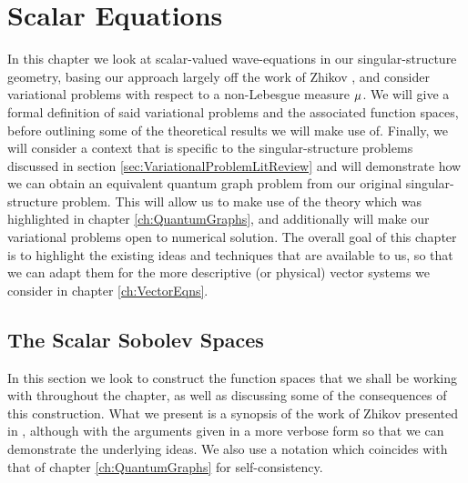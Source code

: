\chapter{Scalar Equations} \label{ch:ScalarEqns}
In this chapter we look at scalar-valued wave-equations in our singular-structure geometry, basing our approach largely off the work of Zhikov \cite{zhikov2000extension}, and consider variational problems with respect to a non-Lebesgue measure $\mu$.
We will give a formal definition of said variational problems and the associated function spaces, before outlining some of the theoretical results we will make use of.
Finally, we will consider a context that is specific to the singular-structure problems discussed in section \ref{sec:VariationalProblemLitReview} and will demonstrate how we can obtain an equivalent quantum graph problem from our original singular-structure problem.
This will allow us to make use of the theory which was highlighted in chapter \ref{ch:QuantumGraphs}, and additionally will make our variational problems open to numerical solution.
The overall goal of this chapter is to highlight the existing ideas and techniques that are available to us, so that we can adapt them for the more descriptive (or physical) vector systems we consider in chapter \ref{ch:VectorEqns}.

\section{The Scalar Sobolev Spaces} \label{sec:ScalarSobSpaces}
In this section we look to construct the function spaces that we shall be working with throughout the chapter, as well as discussing some of the consequences of this construction.
What we present is a synopsis of the work of Zhikov presented in \cite{zhikov2000extension}, although with the arguments given in a more verbose form so that we can demonstrate the underlying ideas. 
We also use a notation which coincides with that of chapter \ref{ch:QuantumGraphs} for self-consistency. \newline

